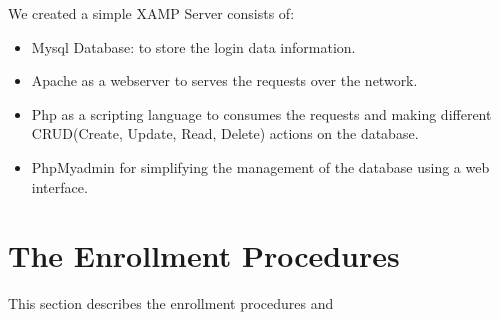    
We created a simple XAMP Server consists of: 
\begin{itemize}
   \item Mysql Database: to store the login data information. 
   \item Apache as a webserver to serves the requests over the network. 
   \item Php as a scripting language to consumes  the requests and making different  CRUD(Create, Update, Read, Delete) actions on the database.
   \item PhpMyadmin for simplifying the management of the database using a web interface. 
\end{itemize}  
\bigskip



\section{The Enrollment Procedures} 
This section describes the enrollment procedures and
  








 








 



 
  